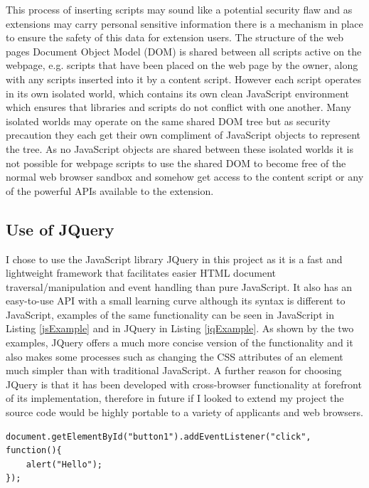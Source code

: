 \documentclass[12pt]{article}
\begin{document}
This process of inserting scripts may sound like a potential security flaw and as extensions may carry personal sensitive information there is a mechanism in place to ensure the safety of this data for extension users. The structure of the web pages Document Object Model (DOM) is shared between all scripts active on the webpage, e.g. scripts that have been placed on the web page by the owner, along with any scripts inserted into it by a content script. However each script operates in its own isolated world, which contains its own clean JavaScript environment which ensures that libraries and scripts do not conflict with one another. Many isolated worlds may operate on the same shared DOM tree but as security precaution they each get their own compliment of JavaScript objects to represent the tree. As no JavaScript objects are shared between these isolated worlds it is not possible for webpage scripts to use the shared DOM to become free of the normal web browser sandbox and somehow get access to the content script or any of the powerful APIs available to the extension. 

\subsection{Use of JQuery}
I chose to use the JavaScript library JQuery in this project as it is a fast and lightweight framework that facilitates easier HTML document traversal/manipulation and event handling than pure JavaScript. It also has an easy-to-use API with a small learning curve although its syntax is different to JavaScript, examples of the same functionality can be seen in JavaScript in Listing \ref{jsExample} and in JQuery in Listing \ref{jqExample}. As shown by the two examples, JQuery offers a much more concise version of the functionality and it also makes some processes such as changing the CSS attributes of an element much simpler than with traditional JavaScript. A further reason for choosing  JQuery is that it has been developed with cross-browser functionality at forefront of its  implementation, therefore in future if I looked to extend my project the source code would be highly portable to a variety of applicants and web browsers. 

\begin{lstlisting}[caption=Setting the onClick functionality of button in JavaScript, label={jsExample}]
document.getElementById("button1").addEventListener("click", function(){ 
    alert("Hello");
});
\end{lstlisting}
\end{document}
